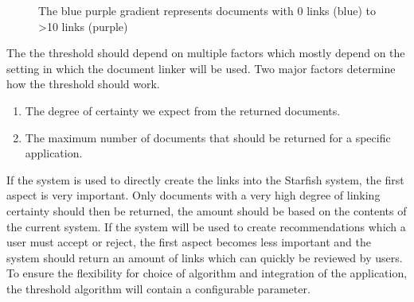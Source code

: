 \begin{figure}[h]
\caption{The blue purple gradient represents documents with 0 links (blue) to >10 links (purple)}
\label{fig:thresholds}
\end{figure}

The the threshold should depend on multiple factors which mostly depend on the setting in which the document linker will be used. Two major factors determine how the threshold should work.
\begin{enumerate}[1.]
	\item The degree of certainty we expect from the returned documents.
	\item The maximum number of documents that should be returned for a specific application.
\end{enumerate}
If the system is used to directly create the links into the Starfish system, the first aspect is very important. Only documents with a very high degree of linking certainty should then be returned, the amount should be based on the contents of the current system. If the system will be used to create recommendations which a user must accept or reject, the first aspect becomes less important and the system should return an amount of links which can quickly be reviewed by users. To ensure the flexibility for choice of algorithm and integration of the application, the threshold algorithm will contain a configurable parameter.

